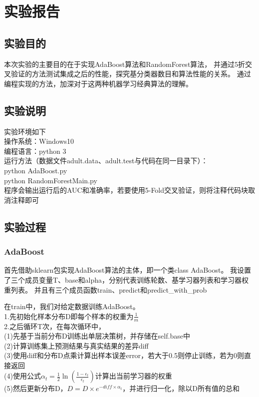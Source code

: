 \documentclass{article}
\begin{document}
	\section{实验报告}
    \subsection{实验目的}
        本次实验的主要目的在于实现AdaBoost算法和RandomForest算法，
        并通过5折交叉验证的方法测试集成之后的性能，探究基分类器数目和算法性能的关系。
        通过编程实现的方法，加深对于这两种机器学习经典算法的理解。
    \subsection{实验说明}
        实验环境如下\\
        操作系统：Windows10\\
        编程语言：python 3\\
        运行方法（数据文件adult.data、adult.test与代码在同一目录下）：\\
        python AdaBoost.py\\
        python RandomForestMain.py\\
        程序会输出运行后的AUC和准确率，若要使用5-Fold交叉验证，则将注释代码块取消注释即可

    \subsection{实验过程}
    \subsubsection{AdaBoost}
        首先借助sklearn包实现AdaBoost算法的主体，即一个类class AdaBoost。
        我设置了三个成员变量T、base和alpha，分别代表训练轮数、基学习器列表和学习器权重列表。
        并且有三个成员函数train、predict和predict\_with\_prob

        在train中，我们对给定数据训练AdaBoost。\\
        1.先初始化样本分布D即每个样本的权重为$\frac{1}{m}$\\
        2.之后循环T次，在每次循环中，\\
        (1)先基于当前分布D训练出单层决策树，并存储在self.base中\\
        (2)计算训练集上预测结果与真实结果的差异diff\\
        (3)使用diff和分布D点乘计算出样本误差error，若大于0.5则停止训练，若为0则直接返回\\
        (4)使用公式$\alpha_t = \frac{1}{2} \ln (\frac{1-\epsilon_t}{\epsilon_t})$计算出当前学习器的权重\\
        (5)然后更新分布D，$D = D \times e^{-diff \times \alpha_t}$，并进行归一化，除以D所有值的总和
\end{document}
